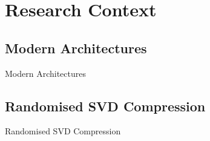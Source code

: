 \section{Research Context}

\subsection{Modern Architectures}
\begin{frame}{Modern Architectures}
\end{frame}

\subsection{Randomised SVD Compression}
\begin{frame}{Randomised SVD Compression}
\end{frame}

